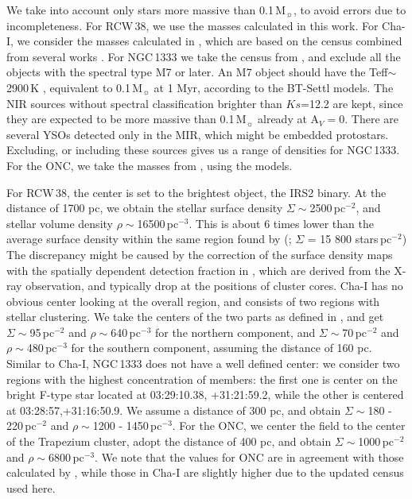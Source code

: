 \documentclass[a4paper,fleqn,usenatbib]{mnras}
\begin{document}
We take into account only stars more massive than 0.1\,M$_{\sun}$, to avoid errors due to incompleteness.
 For RCW\,38, we use the masses calculated in 
this work. For Cha-I, we consider the masses calculated in \citet{muzic15}, which are based on the census combined from several works \citep{luhman04a,luhman07,luhman&muench08, daemgen13, muzic15}.
For NGC\,1333 we take the census from \citet{luhman16}, and exclude all the objects with the spectral type M7 or later. An M7 object should have the Teff$\sim$2900\,K \citep{muzic14}, 
equivalent to 0.1\,M$_{\sun}$ at 1 Myr, according to the BT-Settl models. The NIR sources without spectral classification brighter than $Ks$=12.2 are kept, since they
are expected to be more massive than 0.1\,M$_{\sun}$ already at A$_V=0$. There are several YSOs detected only in the MIR, which might be embedded protostars. Excluding, or 
including these sources gives us a range of densities for NGC\,1333.  
For the ONC, we take the masses from \citet{dario12}, using the \citet{baraffe98} models.

For RCW\,38, the center is set to the brightest object, the IRS2 binary. At the distance of 1700 pc, we obtain the stellar surface density $\Sigma\sim$2500\,pc$^{-2}$, and 
stellar volume density $\rho\sim$16500\,pc$^{-3}$. 
This is about 6 times lower than the average surface density within the same region found by (\citealt{kuhn15}; $\Sigma$ = 15 800 stars\,pc$^{-2}$)
The discrepancy might be caused by the correction of the surface density maps with the spatially dependent detection fraction in \citet{kuhn15}, which are 
derived from the X-ray observation, and typically drop at the positions of cluster cores.
Cha-I has no obvious center looking at the overall region, and consists of two regions with stellar clustering. We take 
the centers of the two parts as defined in \citet{king12a}, and get $\Sigma\sim$95\,pc$^{-2}$ and $\rho\sim$640\,pc$^{-3}$ for the northern component, and 
$\Sigma\sim$70\,pc$^{-2}$ and $\rho\sim$480\,pc$^{-3}$ for the southern component, assuming the distance of 160 pc. Similar to Cha-I, NGC\,1333 does not
have a well defined center: we consider two regions with the highest concentration of members: the first one is center on the bright F-type star
located at 03:29:10.38, +31:21:59.2, while the other is centered at 03:28:57,+31:16:50.9. 
We assume a distance of 300 pc, and obtain $\Sigma\sim$180 - 220\,pc$^{-2}$ and $\rho\sim$1200 - 1450\,pc$^{-3}$. For the ONC, we center the field to the center of 
the Trapezium cluster, adopt the distance of 400 pc, and obtain $\Sigma\sim$1000\,pc$^{-2}$ and $\rho\sim$6800\,pc$^{-3}$.
We note that the values for ONC are in agreement with those calculated by \citet{king12a}, while those in Cha-I are slightly higher due to the 
updated census used here. 
\end{document}
